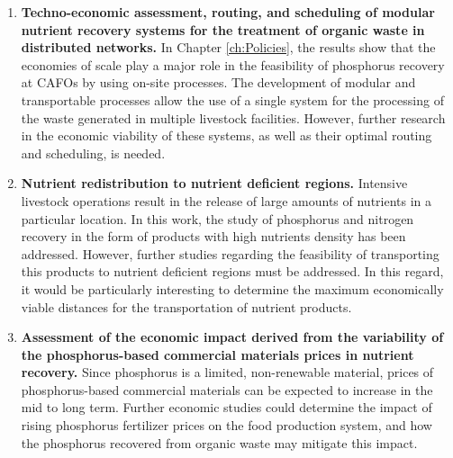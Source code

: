 \begin{enumerate}[font=\bfseries]
	\item \textbf{Techno-economic assessment, routing, and scheduling of modular nutrient recovery systems for the treatment of organic waste in distributed networks.} In Chapter \ref{ch:Policies}, the results show that the economies of scale play a major role in the feasibility of phosphorus recovery at CAFOs by using on-site processes. The development of modular and transportable processes allow the use of a single system for the processing of the waste generated in multiple livestock facilities. However, further research in the economic viability of these systems, as well as their optimal routing and scheduling, is needed.
	
	\item \textbf{Nutrient redistribution to nutrient deficient regions.} Intensive livestock operations result in the release of large amounts of nutrients in a particular location. In this work, the study of phosphorus and nitrogen recovery in the form of products with high nutrients density has been addressed. However, further studies regarding the feasibility of transporting this products to nutrient deficient regions must be addressed. In this regard, it would be particularly interesting to determine the maximum economically viable distances for the transportation of nutrient products.
	
	\item \textbf{Assessment of the economic impact derived from the variability of the phosphorus-based commercial materials prices in nutrient recovery.} Since phosphorus is a limited, non-renewable material, prices of phosphorus-based commercial materials can be expected to increase in the mid to long term. Further economic studies could determine the impact of rising phosphorus fertilizer prices on the food production system, and how the phosphorus recovered from organic waste may mitigate this impact.
	

\end{enumerate}
